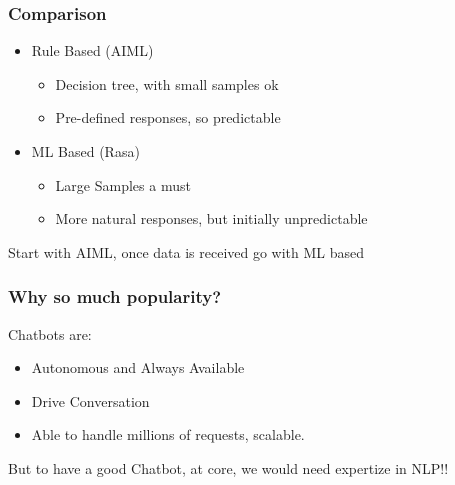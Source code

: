 \begin{frame}\frametitle{Comparison}
\begin{itemize}
\item Rule Based (AIML)
\begin{itemize}
\item Decision tree, with small samples ok
\item Pre-defined responses, so predictable
\end{itemize}
\item ML Based (Rasa)
\begin{itemize}
\item Large Samples a must
\item More natural responses, but initially unpredictable
\end{itemize}
\end{itemize}

Start with AIML, once data is received go with ML based
\end{frame}


\begin{frame}[fragile]\frametitle{Why so much popularity?}
Chatbots are:
	\begin{itemize}
	\item Autonomous and Always Available
	\item Drive Conversation
	\item Able to handle millions of requests, scalable.
	\end{itemize}
	
But to have a good Chatbot, at core, we would need expertize in NLP!!

\end{frame}







